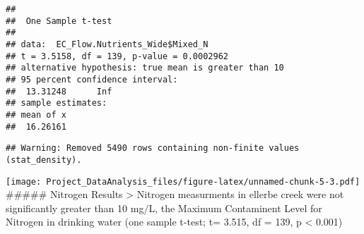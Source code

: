 \documentclass[]{article}
\newenvironment{Shaded}{\begin{snugshade}}{\end{snugshade}}
\newcommand{\CommentTok}[1]{\textcolor[rgb]{0.56,0.35,0.01}{\textit{#1}}}
\newcommand{\DataTypeTok}[1]{\textcolor[rgb]{0.13,0.29,0.53}{#1}}
\newcommand{\DecValTok}[1]{\textcolor[rgb]{0.00,0.00,0.81}{#1}}
\newcommand{\FloatTok}[1]{\textcolor[rgb]{0.00,0.00,0.81}{#1}}
\newcommand{\KeywordTok}[1]{\textcolor[rgb]{0.13,0.29,0.53}{\textbf{#1}}}
\newcommand{\NormalTok}[1]{#1}
\newcommand{\OperatorTok}[1]{\textcolor[rgb]{0.81,0.36,0.00}{\textbf{#1}}}
\newcommand{\StringTok}[1]{\textcolor[rgb]{0.31,0.60,0.02}{#1}}
\begin{document}
\begin{verbatim}
## 
##  One Sample t-test
## 
## data:  EC_Flow.Nutrients_Wide$Mixed_N
## t = 3.5158, df = 139, p-value = 0.0002962
## alternative hypothesis: true mean is greater than 10
## 95 percent confidence interval:
##  13.31248      Inf
## sample estimates:
## mean of x 
##  16.26161
\end{verbatim}

\begin{Shaded}
\end{Shaded}

\begin{verbatim}
## Warning: Removed 5490 rows containing non-finite values (stat_density).
\end{verbatim}

\texttt{[image: Project\_DataAnalysis\_files/figure-latex/unnamed-chunk-5-3.pdf]}
\#\#\#\#\# Nitrogen Results \textgreater{} Nitrogen measurments in
ellerbe creek were not significantly greater than 10 mg/L, the Maximum
Contaminent Level for Nitrogen in drinking water (one sample t-test; t=
3.515, df = 139, p \textless{} 0.001)
\end{document}

